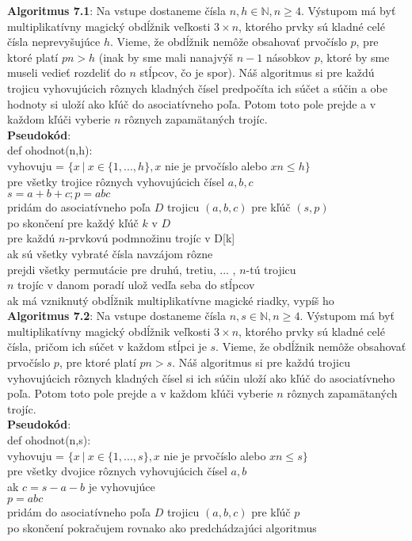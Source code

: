 \documentclass[12pt]{article}
\begin{document}
\textbf{Algoritmus 7.1}: Na vstupe dostaneme čísla $n,h \in \mathbb{N}, n \geq 4$. Výstupom má byť multiplikatívny magický obdĺžnik veľkosti $3 \times n$, ktorého prvky sú kladné celé čísla neprevyšujúce $h$. Vieme, že obdĺžnik nemôže obsahovať prvočíslo $p$, pre ktoré platí $pn > h$ (inak by sme mali nanajvýš $n-1$ násobkov $p$, ktoré by sme museli vedieť rozdeliť do $n$ stĺpcov, čo je spor). Náš algoritmus si pre každú trojicu vyhovujúcich rôznych kladných čísel predpočíta ich súčet a súčin a obe hodnoty si uloží ako kľúč do asociatívneho poľa. Potom toto pole prejde a v každom kľúči vyberie $n$ rôznych zapamätaných trojíc. \\

\textbf{Pseudokód}: \\
def ohodnot(n,h): \\
vyhovuju = $ \{x ~|~ x \in \{1, ... , h\}, x$ nie je prvočíslo alebo $xn \leq h\}$ \\
pre všetky trojice rôznych vyhovujúcich čísel $a,b,c$ \\
$s = a+b+c; p = abc$ \\
pridám do asociatívneho poľa $D$ trojicu $(a,b,c)$ pre kľúč $(s,p)$ \\
po skončení pre každý kľúč $k$ v $D$ \\
pre každú $n$-prvkovú podmnožinu trojíc v D[k] \\
ak sú všetky vybraté čísla navzájom rôzne \\
prejdi všetky permutácie pre druhú, tretiu, ... , $n$-tú trojicu \\
$n$ trojíc v danom poradí ulož vedľa seba do stĺpcov \\
ak má vzniknutý obdĺžnik multiplikatívne magické riadky, vypíš ho \\

\textbf{Algoritmus 7.2}: Na vstupe dostaneme čísla $n,s \in \mathbb{N}, n \geq 4$. Výstupom má byť multiplikatívny magický obdĺžnik veľkosti $3 \times n$, ktorého prvky sú kladné celé čísla, pričom ich súčet v každom stĺpci je $s$. Vieme, že obdĺžnik nemôže obsahovať prvočíslo $p$, pre ktoré platí $pn > s$. Náš algoritmus si pre každú trojicu vyhovujúcich rôznych kladných čísel si ich súčin uloží ako kľúč do asociatívneho poľa. Potom toto pole prejde a v každom kľúči vyberie $n$ rôznych zapamätaných trojíc. \\

\textbf{Pseudokód}: \\
def ohodnot(n,s): \\
vyhovuju = $ \{x ~|~ x \in \{1, ... , s\}, x$ nie je prvočíslo alebo $xn \leq s\}$ \\
pre všetky dvojice rôznych vyhovujúcich čísel $a,b$ \\
ak $c = s-a-b$ je vyhovujúce \\
$p = abc$ \\
pridám do asociatívneho poľa $D$ trojicu $(a,b,c)$ pre kľúč $p$ \\
po skončení pokračujem rovnako ako predchádzajúci algoritmus \\
\end{document}
